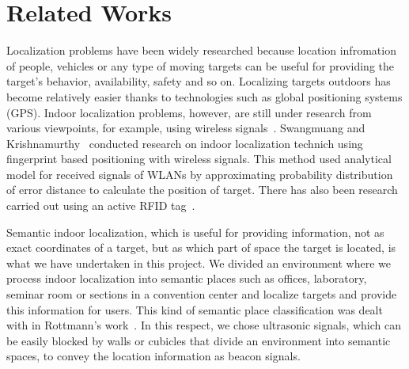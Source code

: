 \section{Related Works}
\label{sec:related-works}


Localization problems have been widely researched because location infromation of people, vehicles or any type of moving targets can be useful for providing the target's behavior, availability, safety and so on. Localizing targets outdoors has become relatively easier thanks to technologies such as global positioning systems (GPS). Indoor localization problems, however, are still under research from various viewpoints, for example, using wireless signals~\cite{liu2007}. Swangmuang and Krishnamurthy~\cite{Swangmuang2008} conducted research on indoor localization technich using fingerprint based positioning with wireless signals. This method used analytical model for received signals of WLANs by approximating probability distribution of error distance to calculate the position of target. There has also been research carried out using an active RFID tag~\cite{Jin2006}.

Semantic indoor localization, which is useful for providing information, not as exact coordinates of a target, but as which part of space the target is located, is what we have undertaken in this project. We divided an environment where we process indoor localization into semantic places such as offices, laboratory, seminar room or sections in a convention center and localize targets and provide this information for users. This kind of semantic place classification was dealt with in Rottmann's work~\cite{rottmann2005semantic}. In this respect, we chose ultrasonic signals, which can be easily blocked by walls or cubicles that divide an environment into semantic spaces, to convey the location information as beacon signals. 



